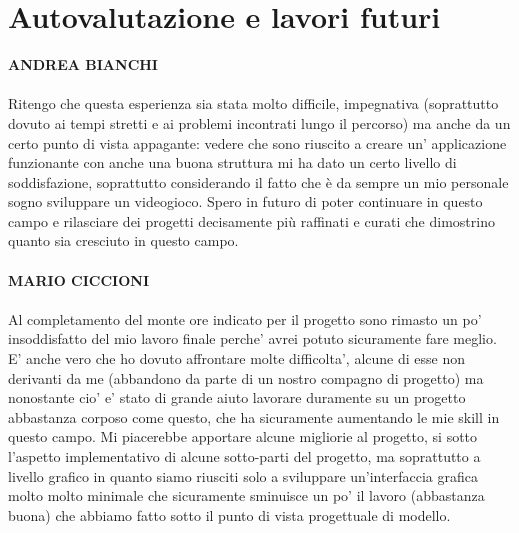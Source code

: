 \documentclass[a4paper,12pt]{report}
\begin{document}
\section{Autovalutazione e lavori futuri}
\textbf{ANDREA BIANCHI}
\\ \\
Ritengo che questa esperienza sia stata molto difficile, impegnativa (soprattutto dovuto ai tempi stretti e ai problemi incontrati lungo il percorso) ma anche da un certo punto di vista appagante: vedere che sono riuscito a creare un' applicazione funzionante con anche una buona struttura mi ha dato un certo livello di soddisfazione, soprattutto considerando il fatto che è da sempre un mio personale sogno sviluppare un videogioco. Spero in futuro di poter continuare in questo campo e rilasciare dei progetti decisamente più raffinati e curati che dimostrino quanto sia cresciuto in questo campo.
\\ \\
\textbf{MARIO CICCIONI}
\\ \\
Al completamento del monte ore indicato per il progetto sono rimasto un po' insoddisfatto del mio lavoro finale perche' avrei potuto sicuramente fare meglio. E' anche vero che ho dovuto affrontare molte difficolta', alcune di esse non derivanti da me (abbandono da parte di un nostro compagno di progetto) ma nonostante cio' e' stato di grande aiuto lavorare duramente su un progetto abbastanza corposo come questo, che ha sicuramente aumentando le mie skill in questo campo. Mi piacerebbe apportare alcune migliorie al progetto, si sotto l'aspetto implementativo di alcune sotto-parti del progetto, ma soprattutto a livello grafico in quanto siamo riusciti solo a sviluppare un'interfaccia grafica molto molto minimale che sicuramente sminuisce un po' il lavoro (abbastanza buona) che abbiamo fatto sotto il punto di vista progettuale di modello.
\end{document}
